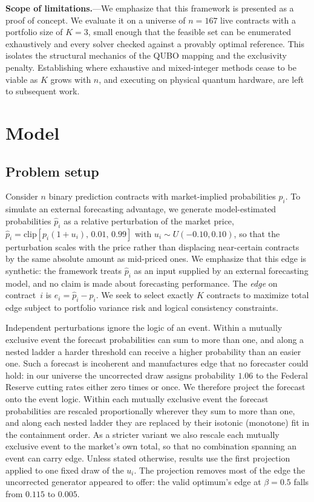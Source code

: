\documentclass[aps, reprint, prl, twocolumn, superscriptaddress,amsmath,amssymb,noeprint]{revtex4-2}
\begin{document}
\textbf{Scope of limitations.}---We emphasize that this framework is
presented as a proof of concept.  We evaluate it on a universe of
$n = 167$ live contracts with a portfolio size of $K = 3$, small enough
that the feasible set can be enumerated exhaustively and every solver
checked against a provably optimal reference.  This isolates the
structural mechanics of the QUBO mapping and the exclusivity penalty.
Establishing where exhaustive and mixed-integer methods cease to be
viable as $K$ grows with $n$, and executing on physical quantum
hardware, are left to subsequent work.

\section{Model}\label{sec:model}\subsection{Problem setup}

Consider $n$ binary prediction contracts with market-implied probabilities
$p_i$. To simulate an external forecasting advantage, we generate model-estimated probabilities $\hat{p}_i$ as a relative perturbation of the market price, $\hat{p}_i = \mathrm{clip}\!\left[p_i(1+u_i),\,0.01,\,0.99\right]$ with $u_i \sim U(-0.10, 0.10)$, so that the perturbation scales with the price rather than displacing near-certain contracts by the same absolute amount as mid-priced ones. We emphasize that this edge is synthetic: the framework treats $\hat{p}_i$ as an input supplied by an external forecasting model, and no claim is made about forecasting performance. The \emph{edge} on
contract~$i$ is $e_i = \hat{p}_i - p_i$.  We seek to select exactly $K$
contracts to maximize total edge subject to portfolio variance risk and
logical consistency constraints.

Independent perturbations ignore the logic of an event.  Within a mutually
exclusive event the forecast probabilities can sum to more than one, and along
a nested ladder a harder threshold can receive a higher probability than an
easier one.  Such a forecast is incoherent and manufactures edge that no
forecaster could hold: in our universe the uncorrected draw assigns probability
$1.06$ to the Federal Reserve cutting rates either zero times or once.  We
therefore project the forecast onto the event logic.  Within each mutually
exclusive event the forecast probabilities are rescaled proportionally
wherever they sum to more than one, and along each nested ladder they are
replaced by their isotonic (monotone) fit in the containment order.  As a
stricter variant we also rescale each mutually exclusive event to the market's
own total, so that no combination spanning an event can carry edge.  Unless
stated otherwise, results use the first projection applied to one fixed draw
of the $u_i$.  The projection removes most of the edge the uncorrected
generator appeared to offer: the valid optimum's edge at $\beta = 0.5$ falls
from $0.115$ to $0.005$.
\end{document}
